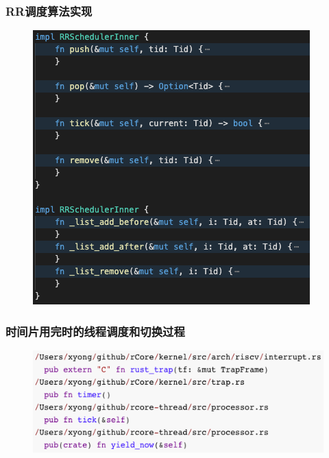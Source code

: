 % 
% 
% 
\begin{frame}[fragile]
    \frametitle{RR调度算法实现}
    \begin{figure}
    \includegraphics[width=0.45\linewidth]{figs/RRSchedulerInner.png}
    \end{figure}
\end{frame}
% 
% 
% 
\begin{frame}[fragile]
    \frametitle{时间片用完时的线程调度和切换过程}
    \begin{figure}
    \includegraphics[width=0.8\linewidth]{figs/RR-timeout.png}
    \end{figure}
\end{frame}
